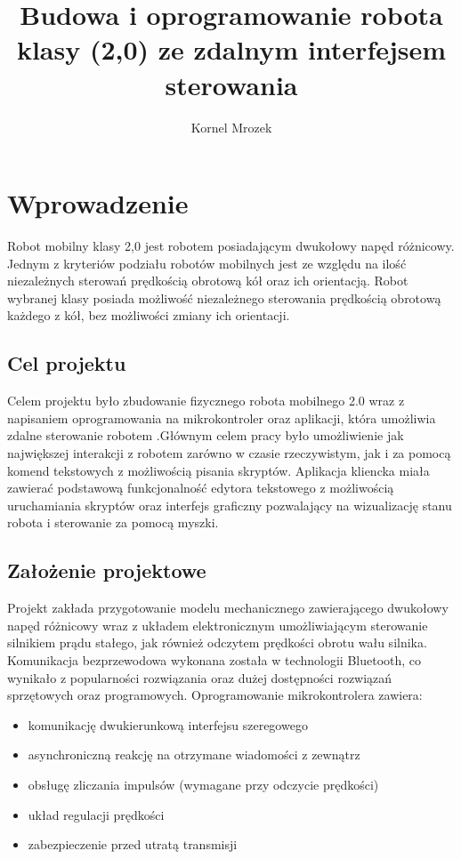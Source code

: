\documentclass[eng,printmode]{mgr}
\title{Budowa i oprogramowanie robota klasy (2,0) ze zdalnym interfejsem sterowania}
\author{Kornel Mrozek}
\begin{document}

\maketitle %

\tableofcontents %

\chapter{Wprowadzenie}

Robot mobilny klasy 2,0 jest robotem posiadającym dwukołowy napęd różnicowy. Jednym z kryteriów podziału robotów mobilnych jest ze względu na ilość niezależnych sterowań prędkością obrotową kół oraz ich orientacją. Robot wybranej klasy posiada możliwość niezależnego sterowania prędkością obrotową każdego z kół, bez możliwości  zmiany ich orientacji.  
 \section{Cel projektu}

Celem projektu było zbudowanie fizycznego robota mobilnego 2.0 wraz z napisaniem oprogramowania na mikrokontroler oraz aplikacji, która umożliwia zdalne sterowanie robotem .Głównym celem pracy było umożliwienie  jak największej interakcji z robotem zarówno w czasie rzeczywistym, jak i za pomocą komend tekstowych z możliwością pisania skryptów. Aplikacja kliencka miała zawierać podstawową funkcjonalność edytora tekstowego z możliwością uruchamiania skryptów oraz interfejs graficzny pozwalający na wizualizację stanu robota  i sterowanie za pomocą myszki.

 \section{Założenie projektowe} 

Projekt zakłada przygotowanie modelu mechanicznego zawierającego dwukołowy napęd różnicowy wraz z  układem elektronicznym umożliwiającym sterowanie silnikiem prądu stałego, jak również odczytem prędkości obrotu wału silnika. Komunikacja bezprzewodowa wykonana została w technologii Bluetooth, co wynikało z popularności rozwiązania oraz dużej dostępności rozwiązań sprzętowych oraz programowych. Oprogramowanie mikrokontrolera zawiera:
\begin{itemize}
  \item komunikację dwukierunkową interfejsu szeregowego
  \item asynchroniczną reakcję na otrzymane wiadomości z zewnątrz
  \item obsługę zliczania impulsów (wymagane przy odczycie prędkości)
  \item układ regulacji prędkości 
  \item zabezpieczenie przed utratą transmisji
\end{itemize}
\end{document}
